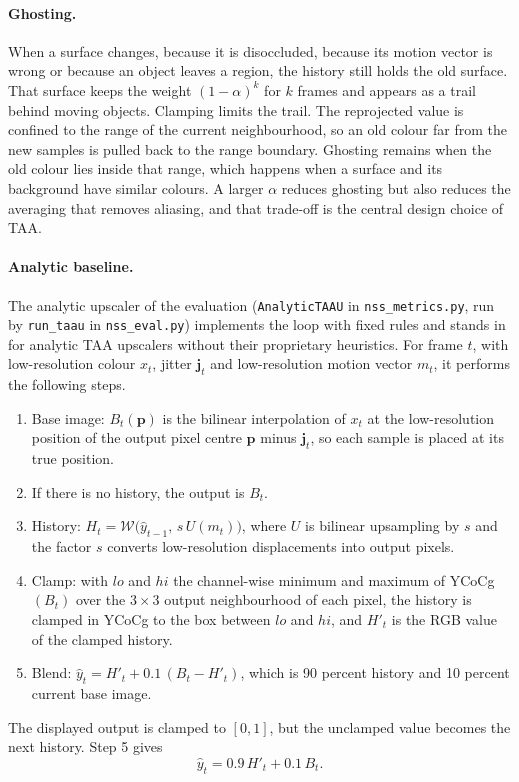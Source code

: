 \paragraph{Ghosting.} When a surface changes, because it is disoccluded, because its motion vector is wrong or because an object leaves a region, the history still holds the old surface. That surface keeps the weight $(1-\alpha)^k$ for $k$ frames and appears as a trail behind moving objects. Clamping limits the trail. The reprojected value is confined to the range of the current neighbourhood, so an old colour far from the new samples is pulled back to the range boundary. Ghosting remains when the old colour lies inside that range, which happens when a surface and its background have similar colours. A larger $\alpha$ reduces ghosting but also reduces the averaging that removes aliasing, and that trade-off is the central design choice of TAA.

\paragraph{Analytic baseline.} The analytic upscaler of the evaluation (\texttt{AnalyticTAAU} in \texttt{nss\_metrics.py}, run by \texttt{run\_taau} in \texttt{nss\_eval.py}) implements the loop with fixed rules and stands in for analytic TAA upscalers without their proprietary heuristics. For frame $t$, with low-resolution colour $x_t$, jitter $\mathbf j_t$ and low-resolution motion vector $m_t$, it performs the following steps.
\begin{enumerate}
\item Base image: $B_t(\mathbf p)$ is the bilinear interpolation of $x_t$ at the low-resolution position of the output pixel centre $\mathbf p$ minus $\mathbf j_t$, so each sample is placed at its true position.
\item If there is no history, the output is $B_t$.
\item History: $H_t=\mathcal W\big(\hat y_{t-1},\,s\,U(m_t)\big)$, where $U$ is bilinear upsampling by $s$ and the factor $s$ converts low-resolution displacements into output pixels.
\item Clamp: with $lo$ and $hi$ the channel-wise minimum and maximum of YCoCg$(B_t)$ over the $3\times3$ output neighbourhood of each pixel, the history is clamped in YCoCg to the box between $lo$ and $hi$, and $H'_t$ is the RGB value of the clamped history.
\item Blend: $\hat y_t=H'_t+0.1\,(B_t-H'_t)$, which is 90 percent history and 10 percent current base image.
\end{enumerate}
The displayed output is clamped to $[0,1]$, but the unclamped value becomes the next history. Step 5 gives
\begin{equation}
\hat y_t=0.9\,H'_t+0.1\,B_t.\label{eq:bg-taa}
\end{equation}

